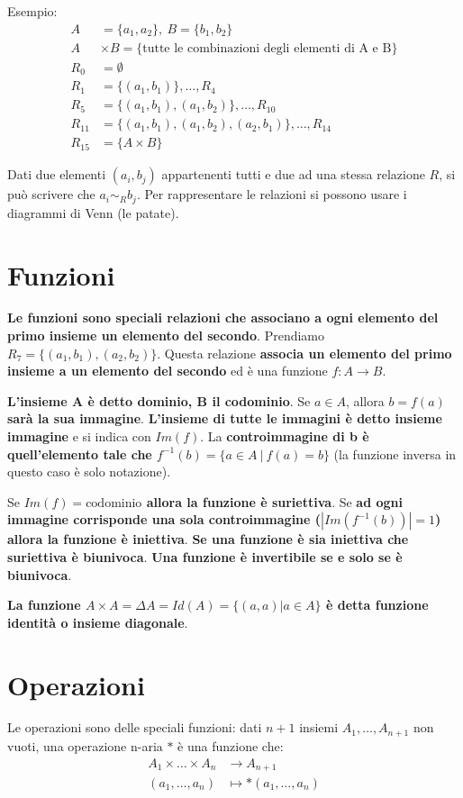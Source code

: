 \documentclass[a4paper,12pt,oneside]{article}
\begin{document}
Esempio:
\begin{align*}
    A &= \{a_1, a_2\}, \: B = \{b_1, b_2\} \\
    A &\times B = \{\text{tutte le combinazioni degli elementi di A e B}\} \\
    R_0 &= \emptyset \\
    R_1 &= \{(a_1, b_1)\}, \dots, R_4 \\
    R_5 &= \{(a_1, b_1), (a_1, b_2)\}, \dots, R_10 \\
    R_{11} &= \{(a_1, b_1), (a_1, b_2), (a_2, b_1)\}, \dots, R_14 \\
    R_{15} &= \{A \times B\}
\end{align*}

Dati due elementi \((a_i, b_j)\) appartenenti tutti e due ad una stessa relazione
\(R\), si può scrivere che \(a_i \sim_R b_j\). Per rappresentare le relazioni
si possono usare i diagrammi di Venn (le patate).

\section{Funzioni}
\textbf{Le funzioni sono speciali relazioni che associano a ogni elemento del 
primo insieme un elemento del secondo}. Prendiamo
\(R_7 = \{(a_1, b_1), (a_2, b_2)\}\). Questa relazione \textbf{associa un elemento
del primo insieme a un elemento del secondo} ed è una funzione \(f: A \to B\).

\textbf{L'insieme A è detto dominio, B il codominio}. Se \(a \in A\), allora
\(b = f(a)\) \textbf{sarà la sua immagine}. \textbf{L'insieme di tutte le immagini
è detto insieme immagine} e si indica con \(Im(f)\). La \textbf{controimmagine di b è
quell'elemento tale che \(f^{-1}(b) = \{ a \in A \: | \: f(a) = b \}\)} (la funzione
inversa in questo caso è solo notazione).

Se \textbf{\(Im(f) = \text{codominio}\) allora la funzione è suriettiva}.
Se \textbf{ad ogni immagine corrisponde una sola controimmagine (\(|Im(f^{-1}(b))| = 1\))
allora la funzione è iniettiva}. \textbf{Se una funzione è sia iniettiva
che suriettiva è biunivoca}. \textbf{Una funzione è invertibile se e solo se
è biunivoca}.

\textbf{La funzione \(A \times A = \Delta A = Id(A) = \{(a,a) | a \in A\}\) è detta 
funzione identità o insieme diagonale}.

\section{Operazioni}
Le operazioni sono delle speciali funzioni: dati \(n+1\) insiemi 
\(A_1, \dots, A_{n+1}\) non vuoti, una operazione n-aria \(\ast\) è una funzione
che:
\begin{align*}
    A_1 \times \dots \times A_n &\to A_{n+1} \\
    (a_1, \dots, a_n) &\mapsto \ast (a_1, \dots, a_n)
\end{align*}
\end{document}

